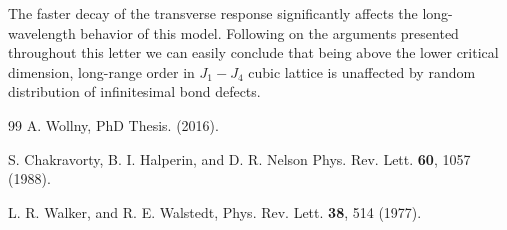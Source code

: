 \documentclass[twocolumn,english,aps,prl,floatfix]{revtex4-1}
\begin{document}
The faster decay of the transverse response significantly affects the
long-wavelength behavior of this model. Following on the arguments 
presented throughout this letter we can easily conclude that being 
above the lower critical dimension, long-range order in $J_1-J_4$ 
cubic lattice is unaffected by random distribution of infinitesimal 
bond defects.

\begin{thebibliography}{99}
        A. Wollny,
        PhD Thesis. (2016).

        S. Chakravorty, B. I. Halperin, and D. R. Nelson
        Phys. Rev. Lett. \textbf{60}, 1057 (1988).

        L. R. Walker, and R. E. Walstedt,
        Phys. Rev. Lett. \textbf{38}, 514 (1977).
\end{thebibliography}
\end{document}
